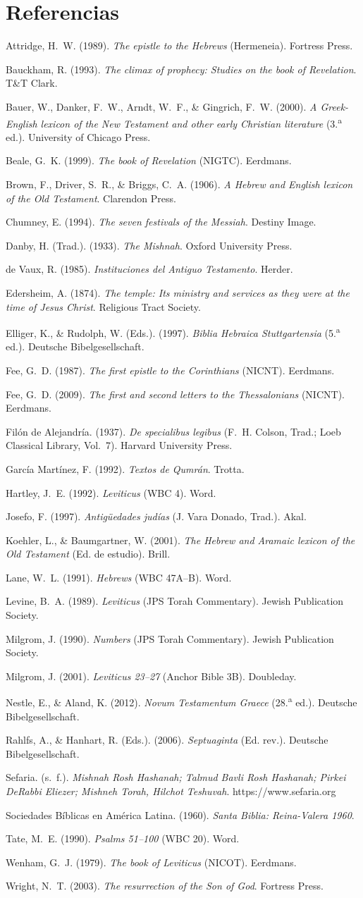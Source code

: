 \documentclass[11pt,letterpaper]{article}
\newcommand{\refapa}[1]{\par{\RaggedRight\hangindent=1.27cm\hangafter=1\noindent #1\par}\vspace{4pt}}
\begin{document}
\section*{Referencias}
\refapa{Attridge, H.~W. (1989). \emph{The epistle to the Hebrews} (Hermeneia). Fortress Press.}
\refapa{Bauckham, R. (1993). \emph{The climax of prophecy: Studies on the book of Revelation}. T\&T Clark.}
\refapa{Bauer, W., Danker, F.~W., Arndt, W.~F., \& Gingrich, F.~W. (2000). \emph{A Greek-English lexicon of the New Testament and other early Christian literature} (3.\textsuperscript{a} ed.). University of Chicago Press.}
\refapa{Beale, G.~K. (1999). \emph{The book of Revelation} (NIGTC). Eerdmans.}
\refapa{Brown, F., Driver, S.~R., \& Briggs, C.~A. (1906). \emph{A Hebrew and English lexicon of the Old Testament}. Clarendon Press.}
\refapa{Chumney, E. (1994). \emph{The seven festivals of the Messiah}. Destiny Image.}
\refapa{Danby, H. (Trad.). (1933). \emph{The Mishnah}. Oxford University Press.}
\refapa{de Vaux, R. (1985). \emph{Instituciones del Antiguo Testamento}. Herder.}
\refapa{Edersheim, A. (1874). \emph{The temple: Its ministry and services as they were at the time of Jesus Christ}. Religious Tract Society.}
\refapa{Elliger, K., \& Rudolph, W. (Eds.). (1997). \emph{Biblia Hebraica Stuttgartensia} (5.\textsuperscript{a} ed.). Deutsche Bibelgesellschaft.}
\refapa{Fee, G.~D. (1987). \emph{The first epistle to the Corinthians} (NICNT). Eerdmans.}
\refapa{Fee, G.~D. (2009). \emph{The first and second letters to the Thessalonians} (NICNT). Eerdmans.}
\refapa{Filón de Alejandría. (1937). \emph{De specialibus legibus} (F.~H. Colson, Trad.; Loeb Classical Library, Vol.~7). Harvard University Press.}
\refapa{García Martínez, F. (1992). \emph{Textos de Qumrán}. Trotta.}
\refapa{Hartley, J.~E. (1992). \emph{Leviticus} (WBC 4). Word.}
\refapa{Josefo, F. (1997). \emph{Antigüedades judías} (J. Vara Donado, Trad.). Akal.}
\refapa{Koehler, L., \& Baumgartner, W. (2001). \emph{The Hebrew and Aramaic lexicon of the Old Testament} (Ed. de estudio). Brill.}
\refapa{Lane, W.~L. (1991). \emph{Hebrews} (WBC 47A--B). Word.}
\refapa{Levine, B.~A. (1989). \emph{Leviticus} (JPS Torah Commentary). Jewish Publication Society.}
\refapa{Milgrom, J. (1990). \emph{Numbers} (JPS Torah Commentary). Jewish Publication Society.}
\refapa{Milgrom, J. (2001). \emph{Leviticus 23--27} (Anchor Bible 3B). Doubleday.}
\refapa{Nestle, E., \& Aland, K. (2012). \emph{Novum Testamentum Graece} (28.\textsuperscript{a} ed.). Deutsche Bibelgesellschaft.}
\refapa{Rahlfs, A., \& Hanhart, R. (Eds.). (2006). \emph{Septuaginta} (Ed. rev.). Deutsche Bibelgesellschaft.}
\refapa{Sefaria. (s.~f.). \emph{Mishnah Rosh Hashanah; Talmud Bavli Rosh Hashanah; Pirkei DeRabbi Eliezer; Mishneh Torah, Hilchot Teshuvah}. https://www.sefaria.org}
\refapa{Sociedades Bíblicas en América Latina. (1960). \emph{Santa Biblia: Reina-Valera 1960}.}
\refapa{Tate, M.~E. (1990). \emph{Psalms 51--100} (WBC 20). Word.}
\refapa{Wenham, G.~J. (1979). \emph{The book of Leviticus} (NICOT). Eerdmans.}
\refapa{Wright, N.~T. (2003). \emph{The resurrection of the Son of God}. Fortress Press.}
\end{document}
